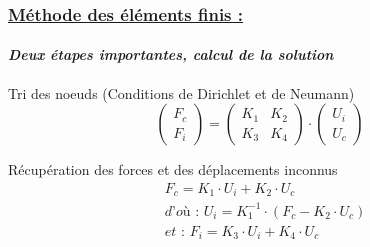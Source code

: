 \documentclass[10pt]{beamer}
\begin{document}
	\begin{frame}
		\frametitle{\uline{M\'ethode des \'el\'ements finis :}}
		\framesubtitle{\textit{Deux \'etapes importantes, calcul de la solution }}
		\begin{block}{Tri des noeuds (Conditions de Dirichlet et de Neumann)}
			\begin{equation}
				\begin{pmatrix}
				F_c \\
				F_i
				\end{pmatrix}
				=
				\begin{pmatrix}
				K_1 & K_2 \\
				K_3 & K_4
				\end{pmatrix}
				\cdot
				\begin{pmatrix}
				U_i \\
				U_c
				\end{pmatrix}
			\end{equation}
		\end{block}
		\begin{block}{R\'ecup\'eration des forces et des d\'eplacements inconnus}
			\begin{align}
				&F_c = K_1 \cdot U_i + K_2 \cdot U_c\\
				&\textit{d'o\`u : } U_i = K_1^{-1} \cdot (F_c - K_2 \cdot U_c)\\
				&\textit{et : } F_i = K_3 \cdot U_i + K_4 \cdot U_c
			\end{align}
		\end{block}
	\end{frame}
\end{document}
